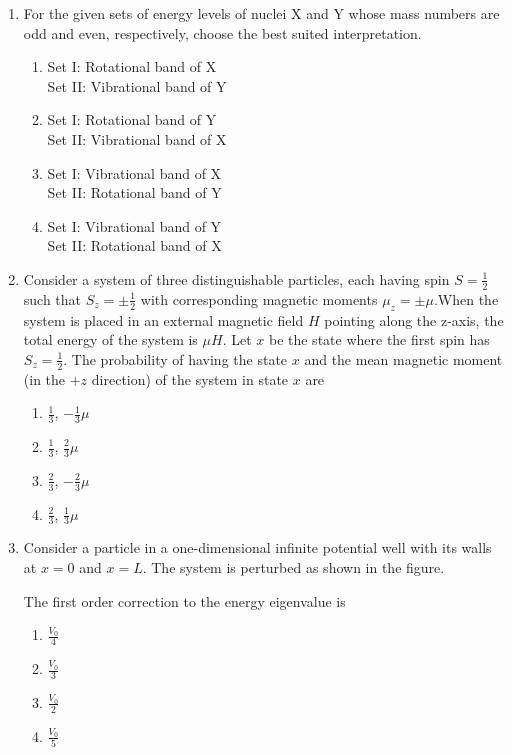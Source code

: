 \documentclass[journal]{IEEEtran}
\begin{document}
\begin{enumerate}
\vspace{1 cm}

\item For the given sets of energy levels of nuclei X and Y whose mass numbers are odd and even, respectively, choose the best suited interpretation. 



\begin{enumerate}
\item Set I: Rotational band of X \\ Set II: Vibrational band of Y
\item Set I: Rotational band of Y \\ Set II: Vibrational band of X
\item Set I: Vibrational band of X \\ Set II: Rotational band of Y
\item Set I: Vibrational band of Y \\ Set II: Rotational band of X
\end{enumerate}

\item Consider a system of three distinguishable particles, each having spin $S=\frac{1}{2}$ such that $S_z=\pm\frac{1}{2}$ with corresponding magnetic moments $\mu_z=\pm\mu$.When the system is placed in an external magnetic field $H$ pointing along the z-axis, the total energy of the system is $\mu H$. Let $x$ be the state where the first spin has $S_z=\frac{1}{2}$. The probability of having the state $x$ and the mean magnetic moment (in the $+z$ direction) of the system in state $x$ are

\begin{enumerate}
\item $\frac{1}{3}$, $-\frac{1}{3}\mu$
\item $\frac{1}{3}$, $\frac{2}{3}\mu$
\item $\frac{2}{3}$, $-\frac{2}{3}\mu$
\item $\frac{2}{3}$, $\frac{1}{3}\mu$
\end{enumerate}

\item Consider a particle in a one-dimensional infinite potential well with its walls at $x=0$ and $x=L$. The system is perturbed as shown in the figure.



The first order correction to the energy eigenvalue is

\begin{enumerate}
\item $\frac{V_0}{4}$
\item $\frac{V_0}{3}$
\item $\frac{V_0}{2}$
\item $\frac{V_0}{5}$
\end{enumerate}


\end{enumerate}
\end{document}

